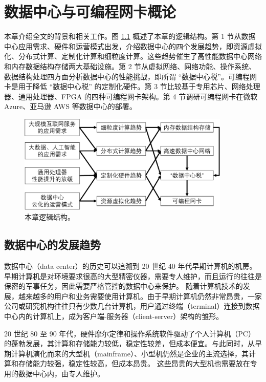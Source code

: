 \chapter{数据中心与可编程网卡概论}
\label{chapter:background}

本章介绍全文的背景和相关工作。图 \ref{background:fig:overview} 概述了本章的逻辑结构。第 1 节从数据中心应用需求、硬件和运营模式出发，介绍数据中心的四个发展趋势，即资源虚拟化、分布式计算、定制化计算和细粒度计算。这些趋势催生了高性能数据中心网络和内存数据结构存储两大基础设施。第 2 节从虚拟网络、网络功能、操作系统、数据结构处理四方面分析数据中心的性能挑战，即所谓 ``数据中心税''。可编程网卡是用于降低 ``数据中心税'' 的定制化硬件。第 3 节比较基于专用芯片、网络处理器、通用处理器、FPGA 的四种可编程网卡架构。第 4 节调研可编程网卡在微软 Azure、亚马逊 AWS 等数据中心的部署。


\begin{figure}[htbp]
	\centering
	\includegraphics[width=0.9\textwidth]{figures/background_overview.pdf}
	\caption{本章逻辑结构。}
	\label{background:fig:overview}
\end{figure}

\section{数据中心的发展趋势}
\label{background:sec:trend}

数据中心（data center）的历史可以追溯到 20 世纪 40 年代早期计算机的机房。
早期计算机是对环境要求很高的大型精密仪器，需要专人维护，而且运行的往往是保密的军事任务，因此需要严格管控的数据中心来保护。
随着计算机技术的发展，越来越多的用户和业务需要使用计算机。由于早期计算机仍然非常昂贵，一家公司或研究机构往往只有少数几台计算机，用户通过终端（terminal）连接到数据中心内的计算机上，成为客户端-服务器（client-server）架构的雏形。

20 世纪 80 至 90 年代，硬件摩尔定律和操作系统软件驱动了个人计算机（PC）的蓬勃发展，其计算和存储能力较低，稳定性较差，但成本便宜。与此同时，从早期计算机演化而来的大型机（mainframe）、小型机仍然是企业的主流选择，其计算和存储能力较强，稳定性较高，但成本昂贵。
这些昂贵的大型机也需要放在专用的数据中心内，由专人维护。

